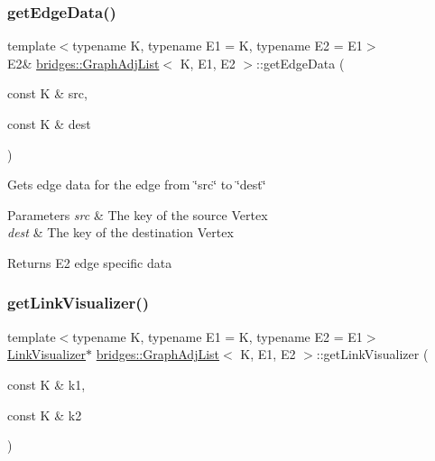 \subsubsection{\texorpdfstring{get\+Edge\+Data()}{getEdgeData()}}
{\footnotesize\ttfamily template$<$typename K, typename E1 = K, typename E2 = E1$>$ \\
E2\& \mbox{\hyperlink{classbridges_1_1_graph_adj_list}{bridges\+::\+Graph\+Adj\+List}}$<$ K, E1, E2 $>$\+::get\+Edge\+Data (\begin{DoxyParamCaption}\item[{const K \&}]{src,  }\item[{const K \&}]{dest }\end{DoxyParamCaption})\hspace{0.3cm}{\ttfamily [inline]}}

Gets edge data for the edge from \char`\"{}src\char`\"{} to \char`\"{}dest\char`\"{}


\begin{DoxyParams}{Parameters}
{\em src} & The key of the source Vertex \\
\hline
{\em dest} & The key of the destination Vertex\\
\hline
\end{DoxyParams}
\begin{DoxyReturn}{Returns}
E2 edge specific data 
\end{DoxyReturn}
\mbox{\label{classbridges_1_1_graph_adj_list_a6e065b1411388387ff1e4df9227ce480}} 
\subsubsection{\texorpdfstring{get\+Link\+Visualizer()}{getLinkVisualizer()}}
{\footnotesize\ttfamily template$<$typename K, typename E1 = K, typename E2 = E1$>$ \\
\mbox{\hyperlink{classbridges_1_1_link_visualizer}{Link\+Visualizer}}$\ast$ \mbox{\hyperlink{classbridges_1_1_graph_adj_list}{bridges\+::\+Graph\+Adj\+List}}$<$ K, E1, E2 $>$\+::get\+Link\+Visualizer (\begin{DoxyParamCaption}\item[{const K \&}]{k1,  }\item[{const K \&}]{k2 }\end{DoxyParamCaption})\hspace{0.3cm}{\ttfamily [inline]}}

